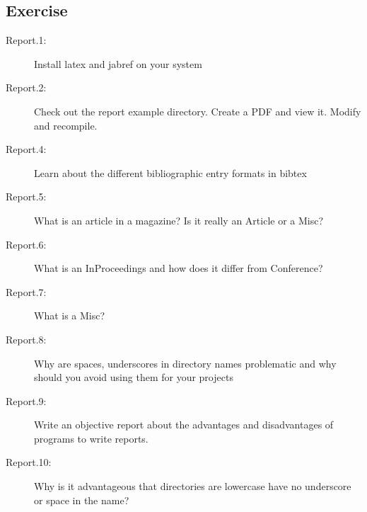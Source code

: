 \subsection{Exercise}\label{exercise}

\begin{description}
\item[Report.1:]
Install latex and jabref on your system
\item[Report.2:]
Check out the report example directory. Create a PDF and view it. Modify
and recompile.
\item[Report.4:]
Learn about the different bibliographic entry formats in bibtex
\item[Report.5:]
What is an article in a magazine? Is it really an Article or a Misc?
\item[Report.6:]
What is an InProceedings and how does it differ from Conference?
\item[Report.7:]
What is a Misc?
\item[Report.8:]
Why are spaces, underscores in directory names problematic and why
should you avoid using them for your projects
\item[Report.9:]
Write an objective report about the advantages and disadvantages of
programs to write reports.
\item[Report.10:]
Why is it advantageous that directories are lowercase have no underscore
or space in the name?
\end{description}
